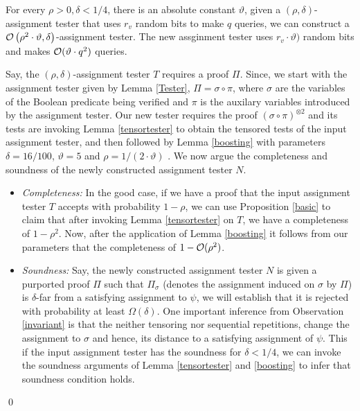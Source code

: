 \begin{corollary}\label{iterate}
  For every $\rho > 0, \delta < 1/4$, there is an absolute constant
  $\vartheta$, given a $(\rho, \delta)$-assignment tester that uses
  $r_v$ random bits to make $q$ queries, we can construct a ${\cal
    O}\left(\rho^2 \cdot \vartheta , {\delta}\right)$-assignment
  tester. The new assginment tester uses $r_v \cdot \vartheta)$ random
  bits and makes ${\cal O}(\vartheta \cdot q^2)$ queries.
\end{corollary}
 Say, the $(\rho, \delta)$-assignment tester $T$
requires a proof $\Pi$. Since, we start with the assignment tester
given by Lemma \ref{Tester}, $\Pi = \sigma \circ \pi$, where $\sigma$
are the variables of the Boolean predicate being verified and $\pi$ is
the auxilary variables introduced by the assignment tester. Our new
tester requires the proof $(\sigma \circ \pi)^{\otimes 2}$ and its
tests are invoking Lemma \ref{tensortester} to obtain the tensored
tests of the input assignment tester, and then followed by Lemma
\ref{boosting} with parameters $\delta = 16/100$, $\vartheta = 5$ and
$\rho = 1/\left(2 \cdot \vartheta\right)$ .  We now argue the
completeness and soundness of the newly constructed assignment tester
$N$.
\begin{itemize}
\item {\em Completeness:} In the good case, if we have a proof that
  the input assignment tester $T$ accepts with probability $1 - \rho$,
  we can use Proposition \ref{basic} to claim that after invoking
  Lemma \ref{tensortester} on $T$, we have a completeness of $1-
  \rho^2$. Now, after the application of Lemma \ref{boosting} it
  follows from our parameters that the completeness of $1 - {\cal
    O}(\rho^2)$.
\item {\em Soundness:} Say, the newly constructed assignment tester
  $N$ is given a purported proof $\Pi$ such that $\Pi_\sigma$ (denotes
  the assignment induced on $\sigma$ by $\Pi$) is $\delta$-far from a
  satisfying assignment to $\psi$, we will establish that it is
  rejected with probability at least $\Omega(\delta)$.  One important
  inference from Observation \ref{invariant} is that the neither
  tensoring nor sequential repetitions, change the assignment to
  $\sigma$ and hence, its distance to a satisfying assignment of
  $\psi$. This if the input assignment tester has the soundness for
  $\delta < 1/4$, we can invoke the soundness arguments of Lemma
  \ref{tensortester} and \ref{boosting} to infer that soundness
  condition holds.
\end{itemize}
\qed

